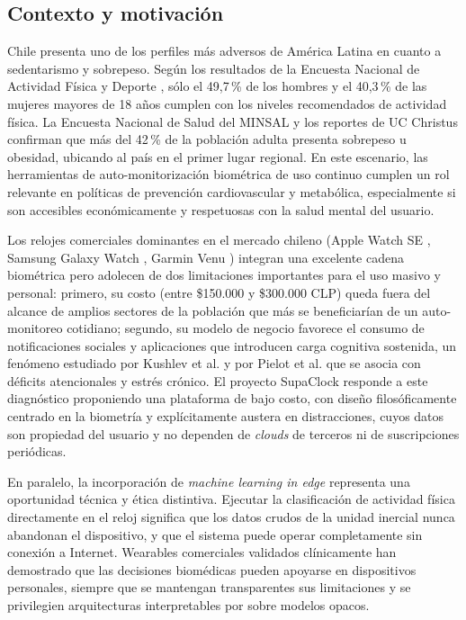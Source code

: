 \documentclass[letterpaper,11pt]{article}
\begin{document}
\subsection{Contexto y motivaci\'on}

Chile presenta uno de los perfiles m\'as adversos de Am\'erica Latina en cuanto a sedentarismo y sobrepeso. Seg\'un los resultados de la Encuesta Nacional de Actividad F\'isica y Deporte \cite{encuesta_af}, s\'olo el 49{,}7\,\% de los hombres y el 40{,}3\,\% de las mujeres mayores de 18 a\~nos cumplen con los niveles recomendados de actividad f\'isica. La Encuesta Nacional de Salud del MINSAL \cite{minsalwearables} y los reportes de UC Christus \cite{obesidad_chile} confirman que m\'as del 42\,\% de la poblaci\'on adulta presenta sobrepeso u obesidad, ubicando al pa\'is en el primer lugar regional. En este escenario, las herramientas de auto-monitorizaci\'on biom\'etrica de uso continuo cumplen un rol relevante en pol\'iticas de prevenci\'on cardiovascular y metab\'olica, especialmente si son accesibles econ\'omicamente y respetuosas con la salud mental del usuario.

Los relojes comerciales dominantes en el mercado chileno (Apple Watch SE \cite{apple_watch_compare}, Samsung Galaxy Watch \cite{galaxy_watch4}, Garmin Venu \cite{garmin_venu}) integran una excelente cadena biom\'etrica pero adolecen de dos limitaciones importantes para el uso masivo y personal: primero, su costo (entre \$150.000 y \$300.000 CLP) queda fuera del alcance de amplios sectores de la poblaci\'on que m\'as se beneficiar\'ian de un auto-monitoreo cotidiano; segundo, su modelo de negocio favorece el consumo de notificaciones sociales y aplicaciones que introducen carga cognitiva sostenida, un fen\'omeno estudiado por Kushlev et al. \cite{Kushlev2016} y por Pielot et al. \cite{Pielot2014} que se asocia con d\'eficits atencionales y estr\'es cr\'onico. El proyecto SupaClock responde a este diagn\'ostico proponiendo una plataforma de bajo costo, con dise\~no filos\'oficamente centrado en la biometr\'ia y expl\'icitamente austera en distracciones, cuyos datos son propiedad del usuario y no dependen de \textit{clouds} de terceros ni de suscripciones peri\'odicas.

En paralelo, la incorporaci\'on de \textit{machine learning in edge} representa una oportunidad t\'ecnica y \'etica distintiva. Ejecutar la clasificaci\'on de actividad f\'isica directamente en el reloj significa que los datos crudos de la unidad inercial nunca abandonan el dispositivo, y que el sistema puede operar completamente sin conexi\'on a Internet. Wearables comerciales validados cl\'inicamente \cite{Shin2019} han demostrado que las decisiones biom\'edicas pueden apoyarse en dispositivos personales, siempre que se mantengan transparentes sus limitaciones y se privilegien arquitecturas interpretables por sobre modelos opacos.
\end{document}
